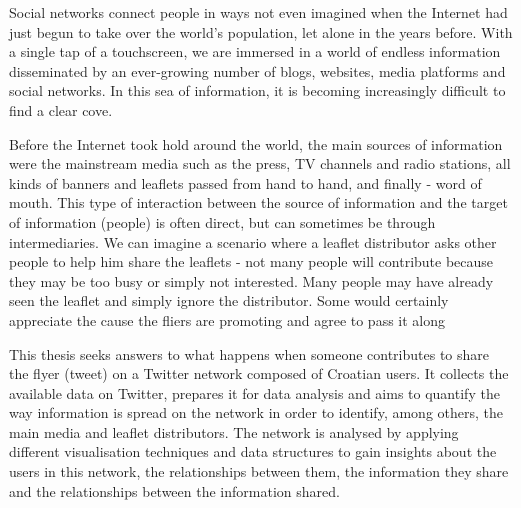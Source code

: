 Social networks connect people in ways not even imagined when the Internet had just begun to take over the world's population, let alone in the years before. With a single tap of a touchscreen, we are immersed in a world of endless information disseminated by an ever-growing number of blogs, websites, media platforms and social networks. In this sea of information, it is becoming increasingly difficult to find a clear cove.

Before the Internet took hold around the world, the main sources of information were the mainstream media such as the press, TV channels and radio stations, all kinds of banners and leaflets passed from hand to hand, and finally - word of mouth. This type of interaction between the source of information and the target of information (people) is often direct, but can sometimes be through intermediaries. We can imagine a scenario where a leaflet distributor asks other people to help him share the leaflets - not many people will contribute because they may be too busy or simply not interested. Many people may have already seen the leaflet and simply ignore the distributor. Some would certainly appreciate the cause the fliers are promoting and agree to pass it along 

This thesis seeks answers to what happens when someone contributes to share the flyer (tweet) on a Twitter network composed of Croatian users. It collects the available data on Twitter, prepares it for data analysis and aims to quantify the way information is spread on the network in order to identify, among others, the main media and leaflet distributors. The network is analysed by applying different visualisation techniques and data structures to gain insights about the users in this network, the relationships between them, the information they share and the relationships between the information shared.